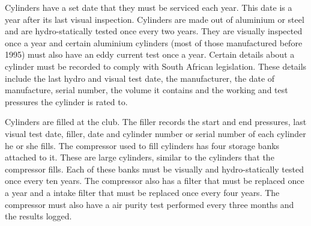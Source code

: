 \documentclass[12pt,a4paper]{article}
\begin{document}
Cylinders have a set date that they must be serviced each year. This date is a
year after its last visual inspection. Cylinders are made out of aluminium or
steel and are hydro-statically tested once every two years. They are visually
inspected once a year and certain aluminium cylinders (most of those
manufactured before 1995) must also have an eddy current test once a year.
Certain details about a cylinder must be recorded to comply with South African
legislation. These details include the last hydro and visual test date, the
manufacturer, the date of manufacture, serial number, the volume it contains and
the working and test pressures the cylinder is rated to.

Cylinders are filled at the club. The filler records the start and end
pressures, last visual test date, filler, date and cylinder number or serial
number of each cylinder he or she fills. The compressor used to fill cylinders
has four storage banks attached to it. These are large cylinders, similar to the
cylinders that the compressor fills. Each of these banks must be visually and
hydro-statically tested once every ten years. The compressor also has a filter
that must be replaced once a year and a intake filter that must be replaced once
every four years. The compressor must also have a air purity test performed every
three months and the results logged.
\end{document}
